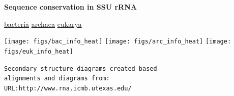 \documentclass[landscape]{slides}
\begin{document}
\begin{slide}
\begin{center}
\large
\textbf{Sequence conservation in SSU rRNA}
\end{center}
\vspace{0.5in}
\small
\hspace{1.5in}
\underline{bacteria}
\hspace{2.2in}
\underline{archaea}
\hspace{2.2in}
\underline{eukarya}

\begin{center}
\texttt{[image: figs/bac\_info\_heat]}
\texttt{[image: figs/arc\_info\_heat]}
\texttt{[image: figs/euk\_info\_heat]}
\end{center}

\begin{flushright}
\tiny{\texttt{Secondary structure diagrams created based}} \\
\tiny{\texttt{alignments and diagrams from:}} \\
\tiny{\texttt{URL:http://www.rna.icmb.utexas.edu/}}
\end{flushright}
\vfill
\end{slide}

% 
\end{document}
